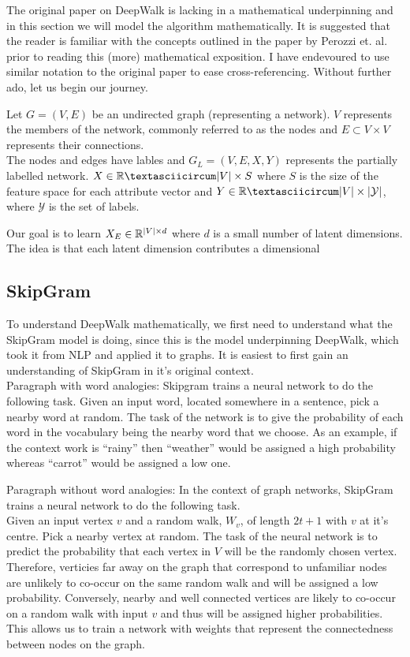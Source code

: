 \documentclass[a4paper]{article}
\begin{document}
The original paper on DeepWalk is lacking in a mathematical underpinning and in
this section we will model the algorithm mathematically. It is suggested that the reader
is familiar with the concepts outlined in the paper by Perozzi et. al. prior to
reading this (more) mathematical exposition. I have endevoured to use similar
notation to the original paper to ease cross-referencing. Without further ado, let us begin
our journey.

\begin{definition}
Let $G = (V, E)$ be an undirected graph (representing a network). $V$ represents the
members of the network, commonly referred to as the nodes and $E \subset V
\times V$ represents their connections.\\

The nodes and edges have lables and $G_L = (V, E, X, Y)$ represents the
partially labelled network. $X \in \R ˆ{|V| \times S}$ where $S$ is the size of
the feature space for each attribute vector and $Y \in \R ˆ{|V| \times
  |\mathcal{Y}|}$, where $\mathcal{Y}$ is the set of labels.
\end{definition}

Our goal is to learn $X_E \in \R ^{|V| \times d}$ where $d$ is a small number
of latent dimensions. The idea is that each latent dimension contributes a 
dimensional

\subsection{SkipGram}
To understand DeepWalk mathematically, we first need to understand what the SkipGram
model is doing, since this is the model underpinning DeepWalk, which took it
from NLP and applied it to graphs. It is easiest to first gain an understanding
of SkipGram in it's original context.\\

Paragraph with word analogies:
Skipgram trains a neural network to do the following task. Given an input word,
located somewhere in a sentence, pick a nearby word at random. The task of the
network is to give the probability of each word in the vocabulary being the
nearby word that we choose. As an example, if the context work is ``rainy'' then
``weather'' would be assigned a high probability whereas ``carrot'' would be
assigned a low one.

Paragraph without word analogies:
In the context of graph networks, SkipGram trains a neural network to do the
following task.\\
Given an input vertex $v$ and a random walk, $W_{v}$, of length $2t+1$ with $v$
at it's centre. Pick a nearby vertex at random. The task of the neural network is to
predict the probability that each vertex in $V$ will be the randomly chosen
vertex. Therefore, verticies far away on the graph that correspond to unfamiliar
nodes are unlikely to co-occur on the same random walk and will be assigned a
low probability. Conversely, nearby and well connected vertices are likely to
co-occur on a random walk with input $v$ and thus will be assigned higher
probabilities. This allows us to train a network with weights that represent the
connectedness between nodes on the graph.
\end{document}
